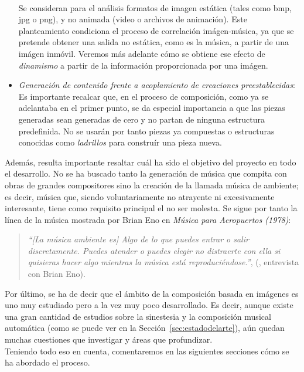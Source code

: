 \begin{itemize}
			\vspace{0.1in}
			\\Se consideran para el análisis formatos de imagen estática (tales como bmp, jpg o png), y no animada (video o archivos de animación). Este planteamiento condiciona el proceso de correlación imágen-música, ya que se pretende obtener una salida no estática, como es la música, a partir de una imágen inmóvil. Veremos más adelante cómo se obtiene ese efecto de \emph{dinamismo} a partir de la información proporcionada por una imágen.
		\item \emph{Generación de contenido frente a acoplamiento de creaciones preestablecidas}:
			\vspace{0.1in}
			\\Es importante recalcar que, en el proceso de composición, como ya se adelantaba en el primer punto, se da especial importancia a que las piezas generadas sean generadas de cero y no partan de ninguna estructura predefinida. No se usarán por tanto piezas ya compuestas o estructuras conocidas como \emph{ladrillos} para construír una pieza nueva.
		\end{itemize}
		
		Además, resulta importante resaltar cuál ha sido el objetivo del proyecto en todo el desarrollo. No se ha buscado tanto la generación de música que compita con obras de grandes compositores sino la creación de la llamada música de ambiente; es decir, música que, siendo voluntariamente no atrayente ni excesivamente interesante, tiene como requisito principal el no ser molesta. Se sigue por tanto la línea de la música mostrada por Brian Eno en \emph{Música para Aeropuertos (1978)}:
		
		\begin{quote}
		\emph{``[La música ambiente es] Algo de lo que puedes entrar o salir discretamente. Puedes atender o puedes elegir no distraerte con ella si quisieras hacer algo mientras la música está reproduciéndose.''}, (\cite{BrianEnoInterview}, entrevista con Brian Eno).
		\end{quote}		
		
		Por último, se ha de decir que el ámbito de la composición basada en imágenes es uno muy estudiado pero a la vez muy poco desarrollado. Es decir, aunque existe una gran cantidad de estudios sobre la sinestesia y la composición musical automática (como se puede ver en la Sección~\ref{sec:estadodelarte}), aún quedan muchas cuestiones que investigar y áreas que profundizar.\\
		
		Teniendo todo eso en cuenta, comentaremos en las siguientes secciones cómo se ha abordado el proceso.
		



